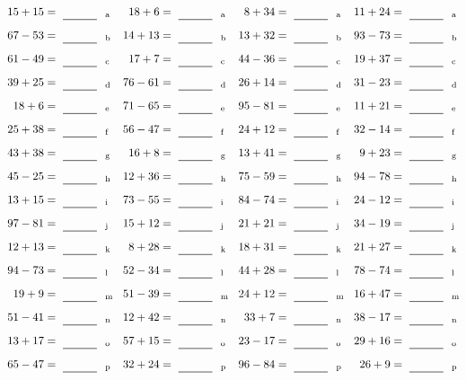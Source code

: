 \documentclass
[
  draft    = true,
  fontsize = 11pt,
  parskip  = half-
]
{scrartcl}
\begin{document}
\clearpage
\begin{align*}
    \pline{15+15}&=\rline{a}
  & \pline{18+6}&=\rline{a}
  & \pline{8+34}&=\rline{a}
  & \pline{11+24}&=\rline{a} \\[1ex]
    \pline{67-53}&=\rline{b}
  & \pline{14+13}&=\rline{b}
  & \pline{13+32}&=\rline{b}
  & \pline{93-73}&=\rline{b} \\[1ex]
    \pline{61-49}&=\rline{c}
  & \pline{17+7}&=\rline{c}
  & \pline{44-36}&=\rline{c}
  & \pline{19+37}&=\rline{c} \\[1ex]
    \pline{39+25}&=\rline{d}
  & \pline{76-61}&=\rline{d}
  & \pline{26+14}&=\rline{d}
  & \pline{31-23}&=\rline{d} \\[1ex]
    \pline{18+6}&=\rline{e}
  & \pline{71-65}&=\rline{e}
  & \pline{95-81}&=\rline{e}
  & \pline{11+21}&=\rline{e} \\[1ex]
    \pline{25+38}&=\rline{f}
  & \pline{56-47}&=\rline{f}
  & \pline{24+12}&=\rline{f}
  & \pline{32-14}&=\rline{f} \\[1ex]
    \pline{43+38}&=\rline{g}
  & \pline{16+8}&=\rline{g}
  & \pline{13+41}&=\rline{g}
  & \pline{9+23}&=\rline{g} \\[1ex]
    \pline{45-25}&=\rline{h}
  & \pline{12+36}&=\rline{h}
  & \pline{75-59}&=\rline{h}
  & \pline{94-78}&=\rline{h} \\[1ex]
    \pline{13+15}&=\rline{i}
  & \pline{73-55}&=\rline{i}
  & \pline{84-74}&=\rline{i}
  & \pline{24-12}&=\rline{i} \\[1ex]
    \pline{97-81}&=\rline{j}
  & \pline{15+12}&=\rline{j}
  & \pline{21+21}&=\rline{j}
  & \pline{34-19}&=\rline{j} \\[1ex]
    \pline{12+13}&=\rline{k}
  & \pline{8+28}&=\rline{k}
  & \pline{18+31}&=\rline{k}
  & \pline{21+27}&=\rline{k} \\[1ex]
    \pline{94-73}&=\rline{l}
  & \pline{52-34}&=\rline{l}
  & \pline{44+28}&=\rline{l}
  & \pline{78-74}&=\rline{l} \\[1ex]
    \pline{19+9}&=\rline{m}
  & \pline{51-39}&=\rline{m}
  & \pline{24+12}&=\rline{m}
  & \pline{16+47}&=\rline{m} \\[1ex]
    \pline{51-41}&=\rline{n}
  & \pline{12+42}&=\rline{n}
  & \pline{33+7}&=\rline{n}
  & \pline{38-17}&=\rline{n} \\[1ex]
    \pline{13+17}&=\rline{o}
  & \pline{57+15}&=\rline{o}
  & \pline{23-17}&=\rline{o}
  & \pline{29+16}&=\rline{o} \\[1ex]
    \pline{65-47}&=\rline{p}
  & \pline{32+24}&=\rline{p}
  & \pline{96-84}&=\rline{p}
  & \pline{26+9}&=\rline{p}
\end{align*}
\end{document}

